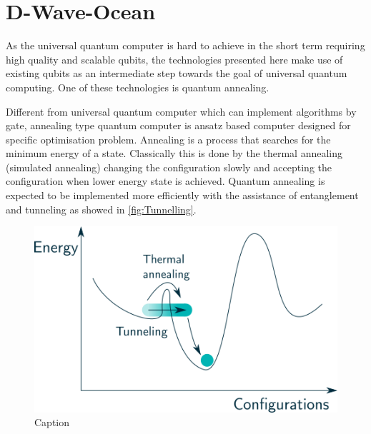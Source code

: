\section{D-Wave-Ocean}

As the universal quantum computer is hard to achieve in the short term requiring high quality and scalable qubits, the technologies presented here make use of existing qubits as an intermediate step towards the goal of universal quantum computing. One of these technologies is quantum annealing.

 Different from universal quantum computer which can implement algorithms by gate, annealing type quantum computer is ansatz based computer designed for specific optimisation problem. Annealing is a process that searches for the minimum energy of a state. Classically this is done by the thermal annealing (simulated annealing) changing the configuration slowly and accepting the configuration when lower energy state is achieved. Quantum annealing is expected to be implemented more efficiently with the assistance of entanglement and tunneling as showed in \autoref{fig:Tunnelling}.\\
 
 \begin{figure}[h!]
    \centering
    \includegraphics{figures/Tunneling.png}
    \caption{Caption}
    \label{fig:Tunnelling}
\end{figure}
 

